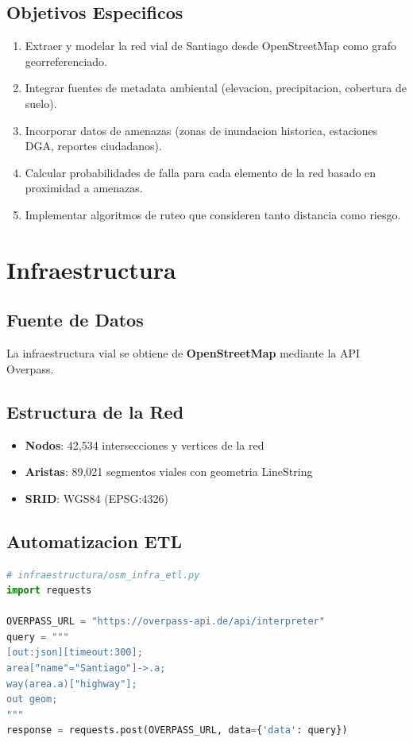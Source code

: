 \documentclass[12pt,a4paper]{article}
\begin{document}
\subsection{Objetivos Especificos}
\begin{enumerate}
    \item Extraer y modelar la red vial de Santiago desde OpenStreetMap como grafo georreferenciado.
    \item Integrar fuentes de metadata ambiental (elevacion, precipitacion, cobertura de suelo).
    \item Incorporar datos de amenazas (zonas de inundacion historica, estaciones DGA, reportes ciudadanos).
    \item Calcular probabilidades de falla para cada elemento de la red basado en proximidad a amenazas.
    \item Implementar algoritmos de ruteo que consideren tanto distancia como riesgo.
\end{enumerate}

\section{Infraestructura}

\subsection{Fuente de Datos}
La infraestructura vial se obtiene de \textbf{OpenStreetMap} mediante la API Overpass.

\subsection{Estructura de la Red}
\begin{itemize}
    \item \textbf{Nodos}: 42,534 intersecciones y vertices de la red
    \item \textbf{Aristas}: 89,021 segmentos viales con geometria LineString
    \item \textbf{SRID}: WGS84 (EPSG:4326)
\end{itemize}

\subsection{Automatizacion ETL}
\begin{lstlisting}[language=Python, basicstyle=\small\ttfamily]
# infraestructura/osm_infra_etl.py
import requests

OVERPASS_URL = "https://overpass-api.de/api/interpreter"
query = """
[out:json][timeout:300];
area["name"="Santiago"]->.a;
way(area.a)["highway"];
out geom;
"""
response = requests.post(OVERPASS_URL, data={'data': query})
\end{lstlisting}
\end{document}
